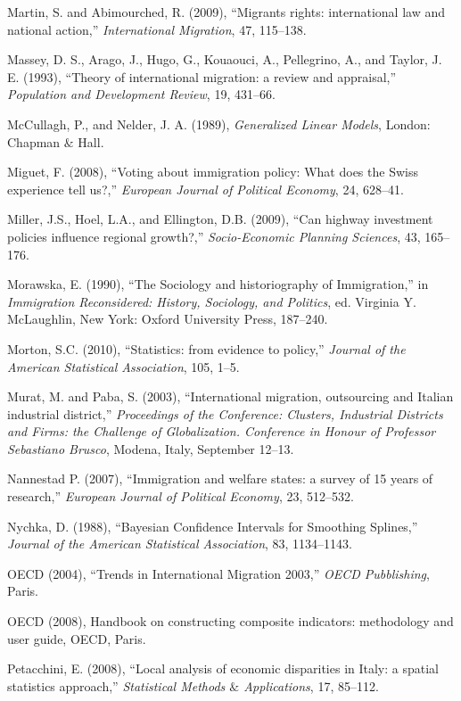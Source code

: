 \documentclass[10pt]{article}
\theoremstyle{definition}
\theoremstyle{plain}
\begin{document}
\begin{thebibliography}{99}
\bibitem{} Martin, S. and Abimourched, R. (2009), ``Migrants rights: international law and national action,'' \textit{International Migration}, 47, 115--138.

\bibitem{} Massey, D. S., Arago, J., Hugo, G., Kouaouci, A., Pellegrino, A., and Taylor, J. E. (1993), ``Theory of international migration: a review and appraisal,'' \textit{Population and Development Review}, 19, 431--66.

\bibitem{} McCullagh, P., and Nelder, J. A. (1989), \textit{Generalized Linear Models}, London: Chapman $\&$ Hall.

\bibitem{} Miguet, F. (2008), ``Voting about immigration policy: What does the Swiss experience tell us?,'' \textit{European Journal of Political Economy}, 24, 628--41.

\bibitem{} Miller, J.S., Hoel, L.A., and Ellington, D.B. (2009), ``Can highway investment policies influence regional growth?,'' \textit{Socio-Economic Planning Sciences}, 43, 165--176.

\bibitem{} Morawska, E. (1990), ``The Sociology and historiography of Immigration,'' in \textit{Immigration Reconsidered: History, Sociology, and Politics}, ed. Virginia Y. McLaughlin, New York: Oxford University Press, 187--240.

\bibitem{} Morton, S.C. (2010), ``Statistics: from evidence to policy,'' \textit{Journal of the American Statistical Association}, 105, 1--5.

\bibitem{} Murat, M. and Paba, S. (2003), ``International migration, outsourcing and Italian industrial district,'' \textit{Proceedings of the Conference: Clusters, Industrial Districts and Firms: the Challenge of Globalization. Conference in Honour of Professor Sebastiano Brusco}, Modena, Italy, September 12--13.

\bibitem{} Nannestad P. (2007), ``Immigration and welfare states: a survey of 15 years of research,'' \textit{European Journal of Political Economy}, 23, 512--532.

\bibitem{} Nychka, D. (1988), ``Bayesian Confidence Intervals for Smoothing Splines,'' \textit{Journal of the American Statistical Association}, 83, 1134--1143.

\bibitem{} OECD (2004), ``Trends in International Migration 2003,'' \textit{OECD Pubblishing}, Paris.

\bibitem{} OECD (2008), Handbook on constructing composite indicators: methodology and user guide, OECD, Paris.

\bibitem{} Petacchini, E. (2008), ``Local analysis of economic disparities in Italy: a spatial statistics approach,'' \textit{Statistical Methods $\&$ Applications}, 17, 85--112.


\end{thebibliography}
\end{document}
